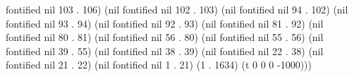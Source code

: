 fontified nil 103 . 106) (nil fontified nil 102 . 103) (nil fontified nil 94 . 102) (nil fontified nil 93 . 94) (nil fontified nil 92 . 93) (nil fontified nil 81 . 92) (nil fontified nil 80 . 81) (nil fontified nil 56 . 80) (nil fontified nil 55 . 56) (nil fontified nil 39 . 55) (nil fontified nil 38 . 39) (nil fontified nil 22 . 38) (nil fontified nil 21 . 22) (nil fontified nil 1 . 21) (1 . 1634) (t 0 0 0 -1000)))
